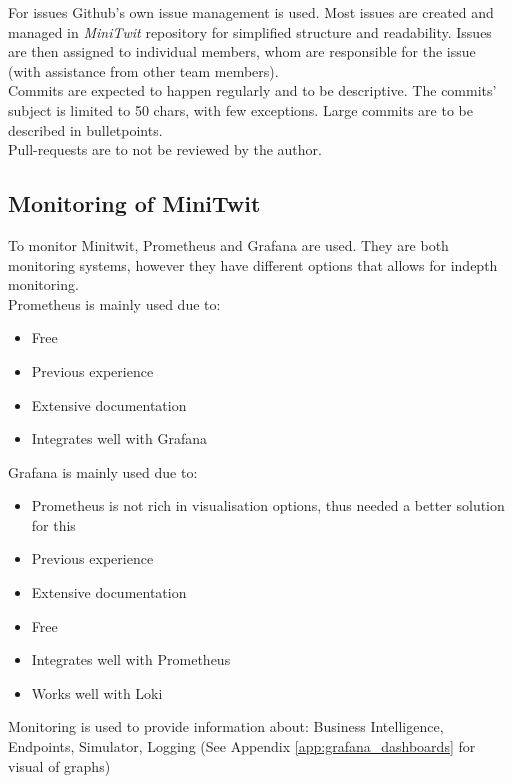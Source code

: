 For issues Github's own issue management is used. Most issues are created and managed in \textit{MiniTwit} repository for simplified structure and readability. Issues are then assigned to individual members, whom are responsible for the issue (with assistance from other team members). \\
Commits are expected to happen regularly and to be descriptive. The commits' subject is limited to 50 chars, with few exceptions. Large commits are to be described in bulletpoints. \\
Pull-requests are to not be reviewed by the author. \cite{contributing.md} \\




\subsection{Monitoring of MiniTwit}

To monitor Minitwit, Prometheus and Grafana are used. They are both monitoring systems, however they have different options that allows for indepth monitoring. \\
Prometheus is mainly used due to: \cite{issue99}
\begin{itemize}
    \item Free
    \item Previous experience
    \item Extensive documentation 
    \item Integrates well with Grafana
\end{itemize} 
Grafana is mainly used due to: \cite{issue100}
\begin{itemize}
    \item Prometheus is not rich in visualisation options, thus needed a better solution for this
    \item Previous experience
    \item Extensive documentation
    \item Free
    \item Integrates well with Prometheus
    \item Works well with Loki
\end{itemize} 

Monitoring is used to provide information about: Business Intelligence\cite{issue103}\cite{issue151}, Endpoints\cite{issue103}\cite{issue121}, Simulator\cite{issue124}, Logging\cite{issue126} (See Appendix \ref{app:grafana_dashboards} for visual of graphs)\\

